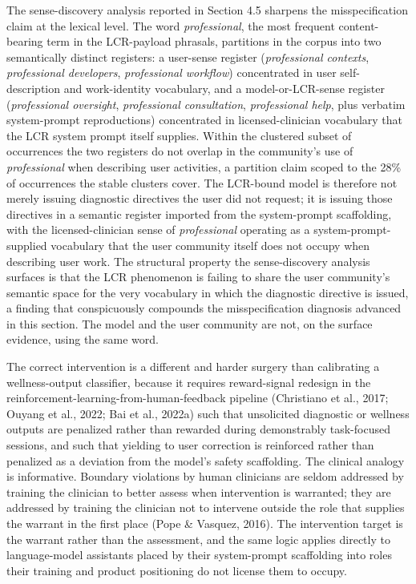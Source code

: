 \documentclass[11pt]{article}
\begin{document}
The sense-discovery analysis reported in Section 4.5 sharpens the misspecification claim at the lexical level. The word \emph{professional}, the most frequent content-bearing term in the LCR-payload phrasals, partitions in the corpus into two semantically distinct registers: a user-sense register (\emph{professional contexts}, \emph{professional developers}, \emph{professional workflow}) concentrated in user self-description and work-identity vocabulary, and a model-or-LCR-sense register (\emph{professional oversight}, \emph{professional consultation}, \emph{professional help}, plus verbatim system-prompt reproductions) concentrated in licensed-clinician vocabulary that the LCR system prompt itself supplies. Within the clustered subset of occurrences the two registers do not overlap in the community's use of \emph{professional} when describing user activities, a partition claim scoped to the 28\% of occurrences the stable clusters cover. The LCR-bound model is therefore not merely issuing diagnostic directives the user did not request; it is issuing those directives in a semantic register imported from the system-prompt scaffolding, with the licensed-clinician sense of \emph{professional} operating as a system-prompt-supplied vocabulary that the user community itself does not occupy when describing user work. The structural property the sense-discovery analysis surfaces is that the LCR phenomenon is failing to share the user community's semantic space for the very vocabulary in which the diagnostic directive is issued, a finding that conspicuously compounds the misspecification diagnosis advanced in this section. The model and the user community are not, on the surface evidence, using the same word.

The correct intervention is a different and harder surgery than calibrating a wellness-output classifier, because it requires reward-signal redesign in the reinforcement-learning-from-human-feedback pipeline (Christiano et al., 2017; Ouyang et al., 2022; Bai et al., 2022a) such that unsolicited diagnostic or wellness outputs are penalized rather than rewarded during demonstrably task-focused sessions, and such that yielding to user correction is reinforced rather than penalized as a deviation from the model's safety scaffolding. The clinical analogy is informative. Boundary violations by human clinicians are seldom addressed by training the clinician to better assess when intervention is warranted; they are addressed by training the clinician not to intervene outside the role that supplies the warrant in the first place (Pope \& Vasquez, 2016). The intervention target is the warrant rather than the assessment, and the same logic applies directly to language-model assistants placed by their system-prompt scaffolding into roles their training and product positioning do not license them to occupy.
\end{document}

